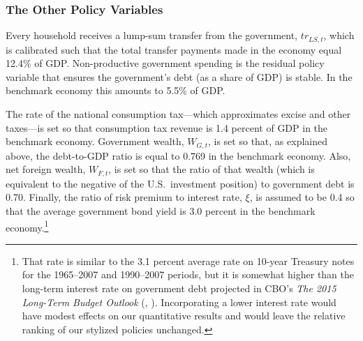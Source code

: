 \documentclass[11pt,leqno,fleqn]{article}
\begin{document}
\subsubsection{The Other Policy Variables}

Every household receives a lump-sum transfer from the government,  $tr_{LS,t}$, which is calibrated such that the total transfer payments made in the economy equal 12.4\% of GDP. Non-productive government spending is the residual policy variable that ensures the government's debt (as a share of GDP) is stable. In the benchmark economy this amounts to 5.5\% of GDP.

The rate of the national consumption tax---which approximates excise and other taxes---is set so that consumption tax revenue is 1.4 percent of GDP in the benchmark economy. Government wealth, $W_{G,t}$, is set so that, as explained above, the debt-to-GDP ratio is equal to 0.769 in the benchmark economy. Also, net foreign wealth, $W_{F,t}$, is set so that the ratio of that wealth (which is equivalent to the negative of the U.S.\ investment position) to government debt is 0.70. Finally, the ratio of risk premium to interest rate, $\xi$, is assumed to be 0.4 so that the average government bond yield is 3.0 percent in the benchmark economy.\footnote{That rate is similar to the 3.1 percent average rate on 10-year Treasury notes for the 1965--2007 and 1990--2007 periods, but it is somewhat higher than the long-term interest rate on government debt projected in CBO's \textit{The 2015 Long-Term Budget Outlook} (\citeauthor{CBO_LTBO:2015}, \citeyear{CBO_LTBO:2015}). Incorporating a lower interest rate would have modest effects on our quantitative results and would leave the relative ranking of our stylized policies unchanged.}
\end{document}
